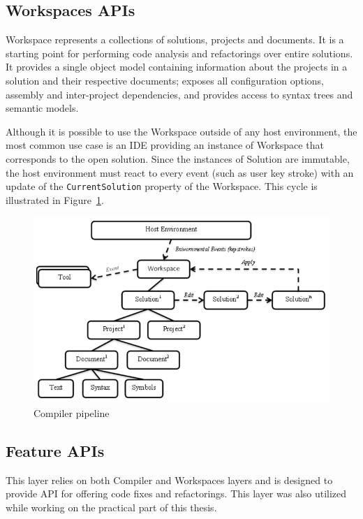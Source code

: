 \documentclass[
  digital, %
  table,   %
  lof,     %
  lot,     %
  oneside,
]{fithesis3}
\begin{document}
  \subsection{Workspaces APIs}
Workspace represents a collections of solutions, projects and documents. It is a starting point for performing code analysis and refactorings over entire solutions. It provides a single object model containing information about the projects in a solution and their respective documents; exposes all configuration options, assembly and inter-project dependencies, and provides access to syntax trees and semantic models. 

Although it is possible to use the Workspace outside of any host environment, the most common use case is an IDE providing an instance of Workspace that corresponds to the open solution. Since the instances of Solution are immutable, the host environment must react to every event (such as user key stroke) with an update of the \texttt{CurrentSolution} property of the Workspace. This cycle is illustrated in Figure~\ref{fig:host-environment-and-workspaces}.

\begin{figure}[h!]
		\centering
			\includegraphics[scale=0.6]{img/host-environment-and-workspaces}
		\caption{Compiler pipeline~\cite{roslyn-overview}}
		\label{fig:host-environment-and-workspaces}
\end{figure}
  
  \subsection{Feature APIs}
This layer relies on both Compiler and Workspaces layers and is designed to provide API for offering code fixes and refactorings. This layer was also utilized while working on the practical part of this thesis.
  
\end{document}

